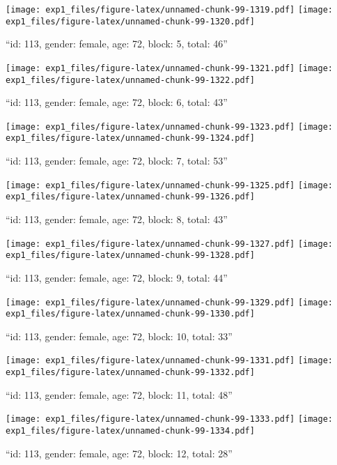 \documentclass[,]{article}
\begin{document}
\texttt{[image: exp1\_files/figure-latex/unnamed-chunk-99-1319.pdf]}
\texttt{[image: exp1\_files/figure-latex/unnamed-chunk-99-1320.pdf]}

\newpage
[1] 

``id: 113, gender: female, age: 72, block: 5, total: 46''

\texttt{[image: exp1\_files/figure-latex/unnamed-chunk-99-1321.pdf]}
\texttt{[image: exp1\_files/figure-latex/unnamed-chunk-99-1322.pdf]}

\newpage
[1] 

``id: 113, gender: female, age: 72, block: 6, total: 43''

\texttt{[image: exp1\_files/figure-latex/unnamed-chunk-99-1323.pdf]}
\texttt{[image: exp1\_files/figure-latex/unnamed-chunk-99-1324.pdf]}

\newpage
[1] 

``id: 113, gender: female, age: 72, block: 7, total: 53''

\texttt{[image: exp1\_files/figure-latex/unnamed-chunk-99-1325.pdf]}
\texttt{[image: exp1\_files/figure-latex/unnamed-chunk-99-1326.pdf]}

\newpage
[1] 

``id: 113, gender: female, age: 72, block: 8, total: 43''

\texttt{[image: exp1\_files/figure-latex/unnamed-chunk-99-1327.pdf]}
\texttt{[image: exp1\_files/figure-latex/unnamed-chunk-99-1328.pdf]}

\newpage
[1] 

``id: 113, gender: female, age: 72, block: 9, total: 44''

\texttt{[image: exp1\_files/figure-latex/unnamed-chunk-99-1329.pdf]}
\texttt{[image: exp1\_files/figure-latex/unnamed-chunk-99-1330.pdf]}

\newpage
[1] 

``id: 113, gender: female, age: 72, block: 10, total: 33''

\texttt{[image: exp1\_files/figure-latex/unnamed-chunk-99-1331.pdf]}
\texttt{[image: exp1\_files/figure-latex/unnamed-chunk-99-1332.pdf]}

\newpage
[1] 

``id: 113, gender: female, age: 72, block: 11, total: 48''

\texttt{[image: exp1\_files/figure-latex/unnamed-chunk-99-1333.pdf]}
\texttt{[image: exp1\_files/figure-latex/unnamed-chunk-99-1334.pdf]}

\newpage
[1] 

``id: 113, gender: female, age: 72, block: 12, total: 28''
\end{document}
